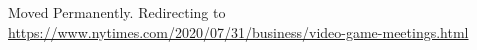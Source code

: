 Moved Permanently. Redirecting to
\url{https://www.nytimes.com/2020/07/31/business/video-game-meetings.html}
